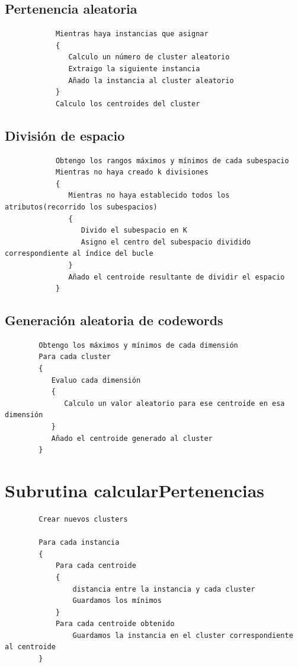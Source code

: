 \documentclass[a4paper]{report}
\begin{document}
		\subsection{Pertenencia aleatoria}
			\begin{verbatim}
			Mientras haya instancias que asignar
			{
			   Calculo un número de cluster aleatorio
			   Extraigo la siguiente instancia
			   Añado la instancia al cluster aleatorio
			}
			Calculo los centroides del cluster
			\end{verbatim}
		
		\subsection{División de espacio}
			\begin{verbatim}
			Obtengo los rangos máximos y mínimos de cada subespacio
			Mientras no haya creado k divisiones
			{
			   Mientras no haya establecido todos los atributos(recorrido los subespacios)
			   {
			      Divido el subespacio en K
			      Asigno el centro del subespacio dividido correspondiente al índice del bucle
			   }
			   Añado el centroide resultante de dividir el espacio
			}
			\end{verbatim}
		
		\subsection{Generación aleatoria de codewords}
		\begin{verbatim}
		Obtengo los máximos y mínimos de cada dimensión
		Para cada cluster
		{
		   Evaluo cada dimensión
		   {
		      Calculo un valor aleatorio para ese centroide en esa dimensión
		   }
		   Añado el centroide generado al cluster
		}
		\end{verbatim}
	\section{Subrutina calcularPertenencias}
	
		\begin{verbatim}
		Crear nuevos clusters 
		
		Para cada instancia
		{
		    Para cada centroide
		    {
		        distancia entre la instancia y cada cluster
		        Guardamos los mínimos 
		    }    
		    Para cada centroide obtenido
		        Guardamos la instancia en el cluster correspondiente al centroide
		}
		\end{verbatim}
	
\end{document}
